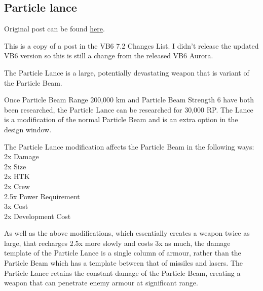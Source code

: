 \documentclass[../Aurora C# unofficial manual.tex]{subfiles}
\begin{document}
	
	\subsection{Particle lance}
	Original post can be found
	\href{http://aurora2.pentarch.org/index.php?topic=8495.msg102678#msg102678}{here}.
	\newline\newline
	
	This is a copy of a post in the VB6 7.2 Changes List. I didn't release the updated VB6 version so this is still a change from the released VB6 Aurora.
	
	The Particle Lance is a large, potentially devastating weapon that is variant of the Particle Beam.
	
	Once Particle Beam Range 200,000 km and Particle Beam Strength 6 have both been researched, the Particle Lance can be researched for 30,000 RP. The Lance is a modification of the normal Particle Beam and is an extra option in the design window.
	
	The Particle Lance modification affects the Particle Beam in the following ways:\\
	2x Damage\\
	2x Size\\
	2x HTK\\
	2x Crew\\
	2.5x Power Requirement\\
	3x Cost\\
	2x Development Cost
	
	As well as the above modifications, which essentially creates a weapon twice as large, that recharges 2.5x more slowly and costs 3x as much, the damage template of the Particle Lance is a single column of armour, rather than the Particle Beam which has a template between that of missiles and lasers. The Particle Lance retains the constant damage of the Particle Beam, creating a weapon that can penetrate enemy armour at significant range.
	
\end{document}
